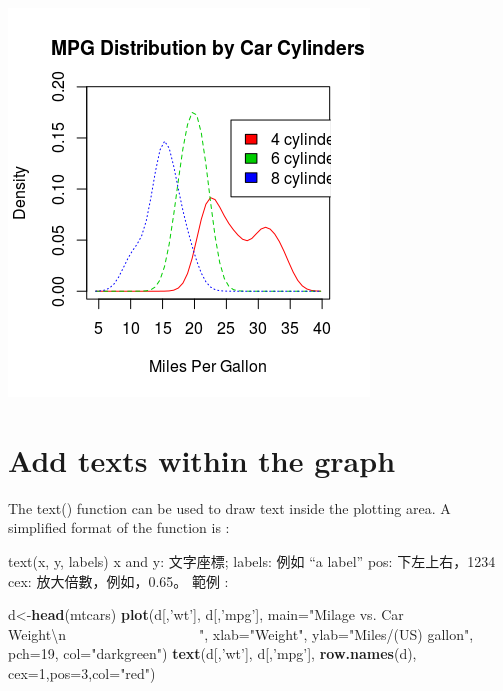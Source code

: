 \documentclass[]{book}
\newenvironment{Shaded}{\begin{snugshade}}{\end{snugshade}}
\newcommand{\CharTok}[1]{\textcolor[rgb]{0.31,0.60,0.02}{#1}}
\newcommand{\DataTypeTok}[1]{\textcolor[rgb]{0.13,0.29,0.53}{#1}}
\newcommand{\DecValTok}[1]{\textcolor[rgb]{0.00,0.00,0.81}{#1}}
\newcommand{\KeywordTok}[1]{\textcolor[rgb]{0.13,0.29,0.53}{\textbf{#1}}}
\newcommand{\NormalTok}[1]{#1}
\newcommand{\StringTok}[1]{\textcolor[rgb]{0.31,0.60,0.02}{#1}}
\theoremstyle{definition}
\theoremstyle{definition}
\theoremstyle{definition}
\theoremstyle{remark}
\begin{document}
\includegraphics{./diagrams/class/mpg_plot01.png}

\hypertarget{add-texts-within-the-graph}{%
\section{Add texts within the graph}\label{add-texts-within-the-graph}}

The text() function can be used to draw text inside the plotting area. A
simplified format of the function is :

text(x, y, labels) x and y: 文字座標; labels: 例如 ``a label'' pos:
下左上右，1234 cex: 放大倍數，例如，0.65。 範例 :

\begin{Shaded}
\begin{Highlighting}[]
\NormalTok{d<-}\KeywordTok{head}\NormalTok{(mtcars)}
\KeywordTok{plot}\NormalTok{(d[,}\StringTok{'wt'}\NormalTok{], d[,}\StringTok{'mpg'}\NormalTok{], }
     \DataTypeTok{main=}\StringTok{"Milage vs. Car Weight}\CharTok{\textbackslash{}n}\StringTok{~~~~~~~~~~~~~~~~~~~"}\NormalTok{,}
      \DataTypeTok{xlab=}\StringTok{"Weight"}\NormalTok{, }\DataTypeTok{ylab=}\StringTok{"Miles/(US) gallon"}\NormalTok{,}
      \DataTypeTok{pch=}\DecValTok{19}\NormalTok{, }\DataTypeTok{col=}\StringTok{"darkgreen"}\NormalTok{)}
\KeywordTok{text}\NormalTok{(d[,}\StringTok{'wt'}\NormalTok{], d[,}\StringTok{'mpg'}\NormalTok{],  }\KeywordTok{row.names}\NormalTok{(d),     }\DataTypeTok{cex=}\DecValTok{1}\NormalTok{,}\DataTypeTok{pos=}\DecValTok{3}\NormalTok{,}\DataTypeTok{col=}\StringTok{"red"}\NormalTok{) }
\end{Highlighting}
\end{Shaded}
\end{document}
